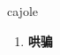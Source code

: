 
\begin{frame}
{\huge cajole}
\begin{center}
\begin{enumerate}\Large
  \item \textbf{哄骗}
\end{enumerate}
\end{center}
\end{frame}
